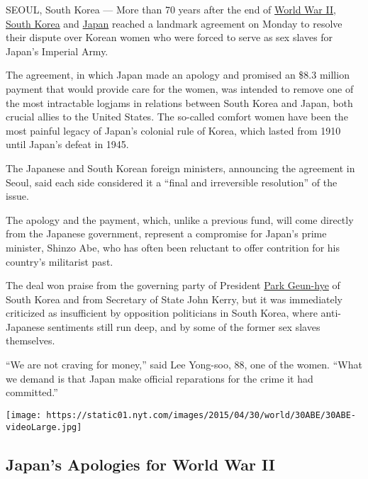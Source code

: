 SEOUL, South Korea --- More than 70 years after the end of
\href{http://topics.nytimes.com/top/reference/timestopics/subjects/w/world_war_ii_/index.html?inline=nyt-classifier}{World
War II},
\href{http://topics.nytimes.com/top/news/international/countriesandterritories/southkorea/index.html?inline=nyt-geo}{South
Korea} and
\href{http://topics.nytimes.com/top/news/international/countriesandterritories/japan/index.html?inline=nyt-geo}{Japan}
reached a landmark agreement on Monday to resolve their dispute over
Korean women who were forced to serve as sex slaves for Japan's Imperial
Army.

The agreement, in which Japan made an apology and promised an \$8.3
million payment that would provide care for the women, was intended to
remove one of the most intractable logjams in relations between South
Korea and Japan, both crucial allies to the United States. The so-called
comfort women have been the most painful legacy of Japan's colonial rule
of Korea, which lasted from 1910 until Japan's defeat in 1945.

The Japanese and South Korean foreign ministers, announcing the
agreement in Seoul, said each side considered it a ``final and
irreversible resolution'' of the issue.

The apology and the payment, which, unlike a previous fund, will come
directly from the Japanese government, represent a compromise for
Japan's prime minister, Shinzo Abe, who has often been reluctant to
offer contrition for his country's militarist past.

The deal won praise from the governing party of President
\href{http://topics.nytimes.com/top/reference/timestopics/people/p/park_geunhye/index.html?inline=nyt-per}{Park
Geun-hye} of South Korea and from Secretary of State John Kerry, but it
was immediately criticized as insufficient by opposition politicians in
South Korea, where anti-Japanese sentiments still run deep, and by some
of the former sex slaves themselves.

``We are not craving for money,'' said Lee Yong-soo, 88, one of the
women. ``What we demand is that Japan make official reparations for the
crime it had committed.''

\href{https://www.nytimes.com/interactive/2015/08/13/world/asia/japan-ww2-shinzo-abe.html}{}

\texttt{[image: https://static01.nyt.com/images/2015/04/30/world/30ABE/30ABE-videoLarge.jpg]}

\hypertarget{japans-apologies-for-world-war-ii}{%
\subsection{Japan's Apologies for World War
II}\label{japans-apologies-for-world-war-ii}}

